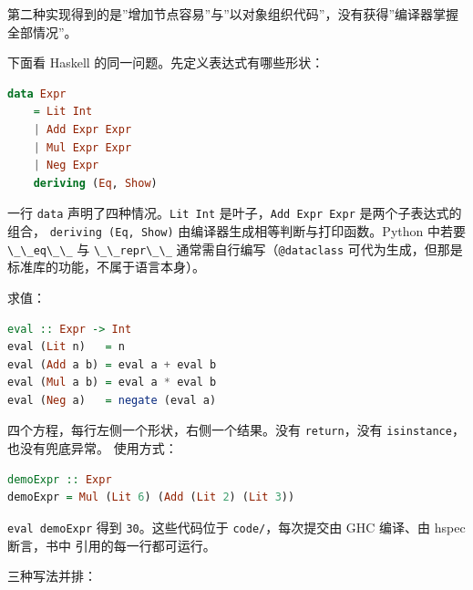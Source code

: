 第二种实现得到的是''增加节点容易''与''以对象组织代码''，没有获得''编译器掌握全部情况''。

下面看 Haskell 的同一问题。先定义表达式有哪些形状：

\begin{lstlisting}[language=Haskell]
data Expr
    = Lit Int
    | Add Expr Expr
    | Mul Expr Expr
    | Neg Expr
    deriving (Eq, Show)
\end{lstlisting}

一行 \passthrough{\lstinline!data!} 声明了四种情况。\passthrough{\lstinline!Lit Int!} 是叶子，\passthrough{\lstinline!Add Expr Expr!} 是两个子表达式的组合，
\passthrough{\lstinline!deriving (Eq, Show)!} 由编译器生成相等判断与打印函数。Python 中若要 \passthrough{\lstinline!\_\_eq\_\_!} 与 \passthrough{\lstinline!\_\_repr\_\_!}
通常需自行编写（\passthrough{\lstinline!@dataclass!} 可代为生成，但那是标准库的功能，不属于语言本身）。

求值：

\begin{lstlisting}[language=Haskell]
eval :: Expr -> Int
eval (Lit n)   = n
eval (Add a b) = eval a + eval b
eval (Mul a b) = eval a * eval b
eval (Neg a)   = negate (eval a)
\end{lstlisting}

四个方程，每行左侧一个形状，右侧一个结果。没有 \passthrough{\lstinline!return!}，没有 \passthrough{\lstinline!isinstance!}，也没有兜底异常。
使用方式：

\begin{lstlisting}[language=Haskell]
demoExpr :: Expr
demoExpr = Mul (Lit 6) (Add (Lit 2) (Lit 3))
\end{lstlisting}

\passthrough{\lstinline!eval demoExpr!} 得到 \passthrough{\lstinline!30!}。这些代码位于 \passthrough{\lstinline!code/!}，每次提交由 GHC 编译、由 hspec 断言，书中
引用的每一行都可运行。

三种写法并排：

